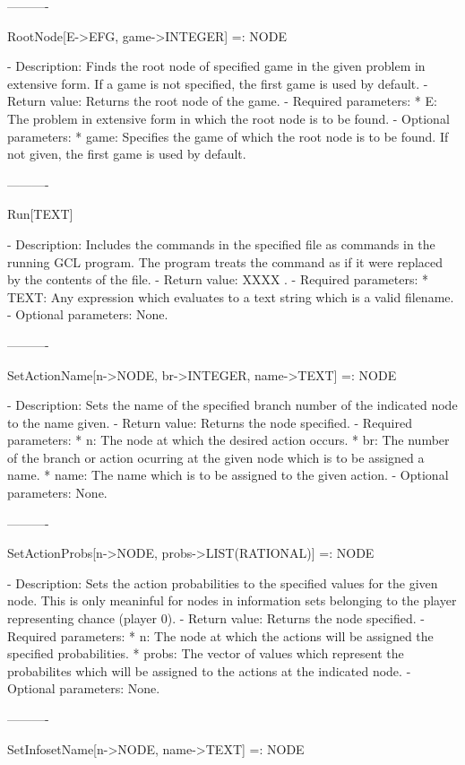 ----------

RootNode[E->EFG, {game->INTEGER}] =: NODE

   -	Description:  Finds the root node of specified game in the given 
	problem in extensive form.  If a game is not specified, the first game 
	is used by default.
   -	Return value:  Returns the root node of the game.
   -	Required parameters:
	  *  E:  The problem in extensive form in which the root node is to be
		found.
   -	Optional parameters:
	  *  game:  Specifies the game of which the root node is to be found.
		If not given, the first game is used by default.

----------

Run[TEXT]

   -	Description:  Includes the commands in the specified file as commands 
	in the running GCL program.  The program treats the command as if it 
	were replaced by the contents of the file.
   -	Return value:  XXXX .
   -	Required parameters:
	  *  TEXT:  Any expression which evaluates to a text string which is a
		valid filename.
   -	Optional parameters:  None.

----------

SetActionName[n->NODE, br->INTEGER, name->TEXT] =: NODE

   -	Description:  Sets the name of the specified branch number of the 
	indicated node to the name given.
   -	Return value:  Returns the node specified.
   -	Required parameters:
	  *  n:  The node at which the desired action occurs.
	  *  br:  The number of the branch or action ocurring at the given node
		which is to be assigned a name.
	  *  name:  The name which is to be assigned to the given action.
   -	Optional parameters:  None.

----------

SetActionProbs[n->NODE, probs->LIST(RATIONAL)] =: NODE

   -	Description:  Sets the action probabilities to the specified values 
	for the given node.  This is only meaninful for nodes in information
	sets belonging to the player representing chance (player 0).
   -	Return value:  Returns the node specified.
   -	Required parameters:
	  *  n:  The node at which the actions will be assigned the specified
		probabilities.
	  *  probs:  The vector of values which represent the probabilites 
		which will be assigned to the actions at the indicated node.
   -	Optional parameters:  None.

----------

SetInfosetName[n->NODE, name->TEXT] =: NODE

